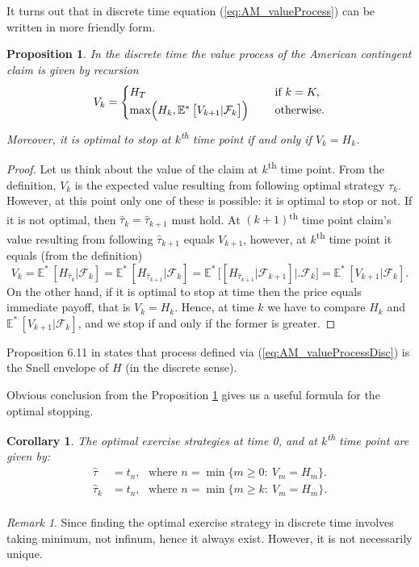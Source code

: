 \documentclass[a4paper,12pt, oneside]{book}
\newtheorem{prop}[thm]{Proposition}
\newtheorem{coro}[thm]{Corollary}
\theoremstyle{definition}
\theoremstyle{remark}
\newtheorem{remark}{Remark}[chapter]
\def\Em{{\mathbb{E}^*}\,}
\begin{document}
It turns out that in discrete time equation (\ref{eq:AM_valueProcess}) can be written in more friendly form.
\begin{prop}
\label{prop:AM_valueProcessDisc}
 In the discrete time the value process of the American contingent claim is given by recursion
 \begin{equation}
  \label{eq:AM_valueProcessDisc}
  V_{k} = \begin{cases}
             H_T &\text{if } k = K,\\
             \max\Bigl(H_{k}, \Em\bigl[ V_{k+1} | \mathcal{F}_{k} \bigr] \Bigl)\ \ \ \ &\text{otherwise.}
            \end{cases}
 \end{equation}
 Moreover, it is optimal to stop at $k$\textsuperscript{th} time point if and only if $V_{k} = H_{k}$. 
\end{prop}
\begin{proof}
Let us think about the value of the claim at $k$\textsuperscript{th} time point. From the definition, $V_{k}$ is the expected value resulting from following optimal strategy $\hat{\tau}_{k}$. However, at this point only one of these is possible: it is optimal to stop or not. If it is not optimal, then $\hat{\tau}_{k} = \hat{\tau}_{k+1}$ must hold. At $(k+1)$\textsuperscript{th} time point claim's value resulting from following $\hat{\tau}_{k+1}$ equals $V_{k+1}$, however, at $k$\textsuperscript{th} time point it equals (from the definition) 
\[ V_{k} = \Em[H_{\hat{\tau}_{k}} | \mathcal{F}_{k}] = \Em[H_{\hat{\tau}_{k+1}} | \mathcal{F}_{k}] = \Em\bigl[[H_{\hat{\tau}_{k+1}} | \mathcal{F}_{k+1}] \bigl|\bigr. \mathcal{F}_{k} \bigr] = \Em[V_{k+1} | \mathcal{F}_{k}].\]
On the other hand, if it is optimal to stop at time then the price equals immediate payoff, that is $V_{k} = H_{k}$. Hence, at time $k$ we have to compare $H_{k}$ and $\Em[V_{k+1} | \mathcal{F}_{k}]$, and we stop if and only if the former is greater.
\end{proof}
Proposition 6.11 in \cite{follmer} states that process defined via (\ref{eq:AM_valueProcessDisc}) is the Snell envelope of $H$ (in the discrete sense).

Obvious conclusion from the Proposition \ref{prop:AM_valueProcessDisc} gives us a useful formula for the optimal stopping.
\begin{coro}
 \label{coro:AM_optStopDisc}
 The optimal exercise strategies at time 0, and at $k$\textsuperscript{th} time point are given by:
 \begin{equation}
  \label{eq:AM_optStopDisc}
  \begin{split}
   \hat{\tau} &= t_n,\ \ \ \text{where } n = \min\{m \geq 0:\ V_m = H_m \}.\\
   \hat{\tau}_{k} &= t_n,\ \ \ \text{where } n = \min\{m \geq k:\ V_m = H_m \}.\\
  \end{split}
 \end{equation}
\end{coro}
\begin{remark}
 Since finding the optimal exercise strategy in discrete time involves taking minimum, not infinum, hence it always exist. However, it is not necessarily unique.
\end{remark}
\end{document}

